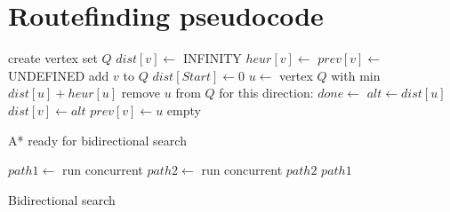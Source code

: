 \chapter{Routefinding pseudocode}\label{ch:astar}
\begin{algorithm}
\begin{algorithmic}[1]
  \State create vertex set $Q$ 
  \State
   
    \State $dist[v] \gets$ INFINITY 
    \State {}
    \State
    \State $heur[v] \gets$  
    \State
    \State $prev[v] \gets$ UNDEFINED 
    \State {}
    \State
    \State add $v$ to $Q$ 
  \EndFor
  \State
  \State $dist[Start] \gets 0$
  \State
    \State $u \gets$ vertex \In $Q$ with min $dist[u] + heur[u]$
    \State remove $u$ from $Q$
    \State {}
    \State
      \State for this direction: $done \gets$ \True
      \State \Return {}
    \EndIf
    \State
     
      \State $alt \gets dist[u]$
        \State $dist[v] \gets alt$
        \State $prev[v] \gets u$
      \EndIf
    \EndFor
  \EndWhile
  \State \Return empty
\EndFunction
\end{algorithmic}
\caption{A* ready for bidirectional search}
\label{alg:bi_astar}
\end{algorithm}

\begin{algorithm}
\begin{algorithmic}[1]
  \State $path1 \gets$ run  concurrent
  \State $path2 \gets$ run  concurrent
  \State
    \State \Return $path2$
  \Else
    \State \Return $path1$
  \EndIf
\EndFunction
\end{algorithmic}
\caption{Bidirectional search}
\label{alg:bi_search}
\end{algorithm}

